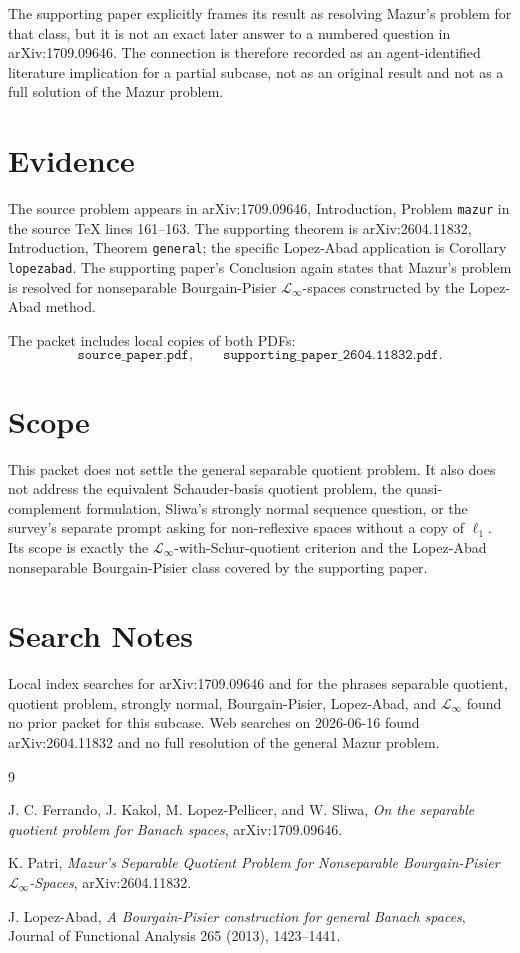 \documentclass[11pt]{article}
\newcommand{\linf}{\mathcal{L}_{\infty}}
\begin{document}
The supporting paper explicitly frames its result as resolving Mazur's
problem for that class, but it is not an exact later answer to a numbered
question in arXiv:1709.09646. The connection is therefore recorded as an
agent-identified literature implication for a partial subcase, not as an
original result and not as a full solution of the Mazur problem.

\section*{Evidence}

The source problem appears in arXiv:1709.09646, Introduction, Problem
\texttt{mazur} in the source TeX lines 161--163. The supporting theorem is
arXiv:2604.11832, Introduction, Theorem \texttt{general}; the specific
Lopez-Abad application is Corollary \texttt{lopezabad}. The supporting paper's
Conclusion again states that Mazur's problem is resolved for nonseparable
Bourgain-Pisier \(\linf\)-spaces constructed by the Lopez-Abad method.

The packet includes local copies of both PDFs:
\[
\texttt{source\_paper.pdf}, \qquad
\texttt{supporting\_paper\_2604.11832.pdf}.
\]

\section*{Scope}

This packet does not settle the general separable quotient problem. It also
does not address the equivalent Schauder-basis quotient problem, the
quasi-complement formulation, Sliwa's strongly normal sequence question, or
the survey's separate prompt asking for non-reflexive spaces without a copy of
\(\ell_1\). Its scope is exactly the \(\linf\)-with-Schur-quotient criterion
and the Lopez-Abad nonseparable Bourgain-Pisier class covered by the
supporting paper.

\section*{Search Notes}

Local index searches for arXiv:1709.09646 and for the phrases separable
quotient, quotient problem, strongly normal, Bourgain-Pisier, Lopez-Abad, and
\(\linf\) found no prior packet for this subcase. Web searches on
2026-06-16 found arXiv:2604.11832 and no full resolution of the general
Mazur problem.

\begin{thebibliography}{9}

J. C. Ferrando, J. Kakol, M. Lopez-Pellicer, and W. Sliwa,
\emph{On the separable quotient problem for Banach spaces},
arXiv:1709.09646.

K. Patri,
\emph{Mazur's Separable Quotient Problem for Nonseparable Bourgain-Pisier
\(\mathcal{L}_\infty\)-Spaces},
arXiv:2604.11832.

J. Lopez-Abad,
\emph{A Bourgain-Pisier construction for general Banach spaces},
Journal of Functional Analysis 265 (2013), 1423--1441.

\end{thebibliography}
\end{document}
